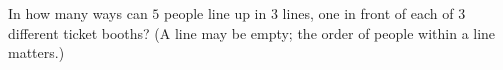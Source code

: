 In how many ways can $5$ people line up in $3$ lines, one in front of each of $3$ different ticket booths? (A line may be empty; the order of people within a line matters.)

